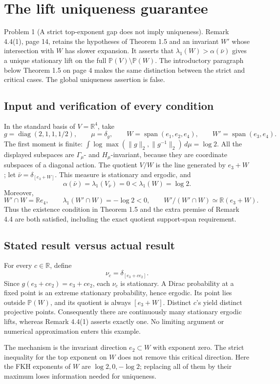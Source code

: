 \documentclass[10pt]{article}
\begin{document}
\section*{The lift uniqueness guarantee}
Problem 1 (A strict top-exponent gap does not imply uniqueness).  Remark 4.4(1), page 14, retains the hypotheses of Theorem 1.5 and an invariant \(W'\) whose intersection with \(W\) has slower expansion. It asserts that \(\lambda_1(W)>\alpha(\bar\nu)\) gives a unique stationary lift on the full \(\mathbb P(V)\setminus\mathbb P(W)\). The introductory paragraph below Theorem 1.5 on page 4 makes the same distinction between the strict and critical cases. The global uniqueness assertion is false.\par
\subsection*{Input and verification of every condition}
In the standard basis of \(V=\mathbb R^4\), take \[g=\operatorname{diag}(2,1,1,1/2),\qquad \mu=\delta_g,\qquad
 W=\operatorname{span}(e_1,e_2,e_4),\qquad W'=\operatorname{span}(e_3,e_4).\] The first moment is finite: \(\int\log\max(\|g\|_2,\|g^{-1}\|_2)\,d\mu=\log2\). All the displayed subspaces are \(\Gamma_\mu\)- and \(H_\mu\)-invariant, because they are coordinate subspaces of a diagonal action. The quotient \(V/W\) is the line generated by \(e_3+W\); let \(\bar\nu=\delta_{[e_3+W]}\). This measure is stationary and ergodic, and \[\alpha(\bar\nu)=\lambda_1(V_{\bar\nu})=0
 <\lambda_1(W)=\log2.\] Moreover, \[W'\cap W=\mathbb Re_4,\qquad
 \lambda_1(W'\cap W)=-\log2<0,\qquad
 W'/(W'\cap W)\simeq\mathbb R(e_3+W).\] Thus the existence condition in Theorem 1.5 and the extra premise of Remark 4.4 are both satisfied, including the exact quotient support-span requirement.\par
\subsection*{Stated result versus actual result}
For every \(c\in\mathbb R\), define \[\nu_c=\delta_{[e_3+ce_2]}.\] Since \(g(e_3+ce_2)=e_3+ce_2\), each \(\nu_c\) is stationary. A Dirac probability at a fixed point is an extreme stationary probability, hence ergodic. Its point lies outside \(\mathbb P(W)\), and its quotient is always \([e_3+W]\). Distinct \(c\)’s yield distinct projective points. Consequently there are continuously many stationary ergodic lifts, whereas Remark 4.4(1) asserts exactly one. No limiting argument or numerical approximation enters this example.\par
The mechanism is the invariant direction \(e_2\subset W\) with exponent zero. The strict inequality for the top exponent on \(W\) does not remove this critical direction. Here the FKH exponents of \(W\) are \(\log2,0,-\log2\); replacing all of them by their maximum loses information needed for uniqueness.\par
\end{document}

